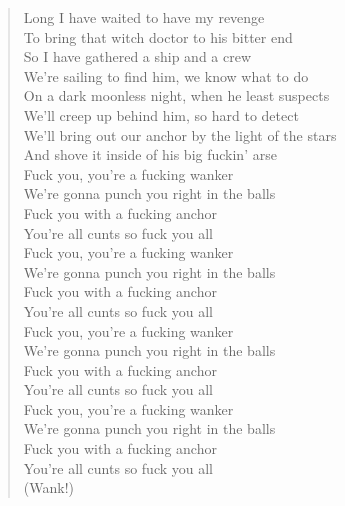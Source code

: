 \documentclass[11pt]{article}
\begin{document}
\begin{verse}
Long I have waited to have my revenge\\
To bring that witch doctor to his bitter end\\
So I have gathered a ship and a crew\\
We're sailing to find him, we know what to do\\
On a dark moonless night, when he least suspects\\
We'll creep up behind him, so hard to detect\\
We'll bring out our anchor by the light of the stars\\
And shove it inside of his big fuckin' arse\\
\vspace*{1em}
Fuck you, you're a fucking wanker\\
We're gonna punch you right in the balls\\
Fuck you with a fucking anchor\\
You're all cunts so fuck you all\\
Fuck you, you're a fucking wanker\\
We're gonna punch you right in the balls\\
Fuck you with a fucking anchor\\
You're all cunts so fuck you all\\
\vspace*{1em}
Fuck you, you're a fucking wanker\\
We're gonna punch you right in the balls\\
Fuck you with a fucking anchor\\
You're all cunts so fuck you all\\
Fuck you, you're a fucking wanker\\
We're gonna punch you right in the balls\\
Fuck you with a fucking anchor\\
You're all cunts so fuck you all\\
\vspace*{1em}
(Wank!)\\
\end{verse}
\clearpage
\end{document}
